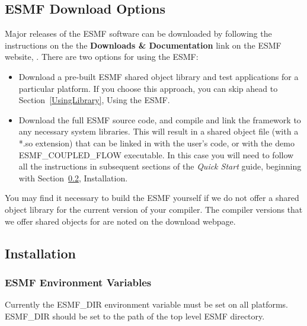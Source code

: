 
\subsection{ESMF Download Options}

Major releases of the ESMF software can be downloaded by following
the instructions on the 
the {\bf Downloads \& Documentation} link on the ESMF 
website, .  There are two options for using the ESMF:

\begin{itemize}
\item Download a pre-built ESMF shared object library and
test applications for a particular platform.  If you choose
this approach, you can skip ahead to Section~\ref{UsingLibrary},
Using the ESMF.  
\item Download the full ESMF source code, and compile and link
the framework to any necessary system libraries.  This will
result in a shared object file (with a *.so extension)
that can be linked in with the user's code, or with the demo
{ESMF\_COUPLED\_FLOW} executable.  In this case you will need
to follow all the instructions in subsequent sections of the 
{\it Quick Start} guide, beginning with Section~\ref{InstallProcedures},
Installation.
\end{itemize}

You may find it necessary to build the ESMF yourself
if we do not offer a shared object library for the current
version of your compiler.  The compiler versions that we offer
shared objects for are noted on the download webpage.

\subsection{Installation}
\label{InstallProcedures}



\subsubsection{ESMF Environment Variables}

Currently the ESMF\_DIR environment variable must be set on all
platforms.  ESMF\_DIR should be set to the path of the top
level ESMF directory.  


